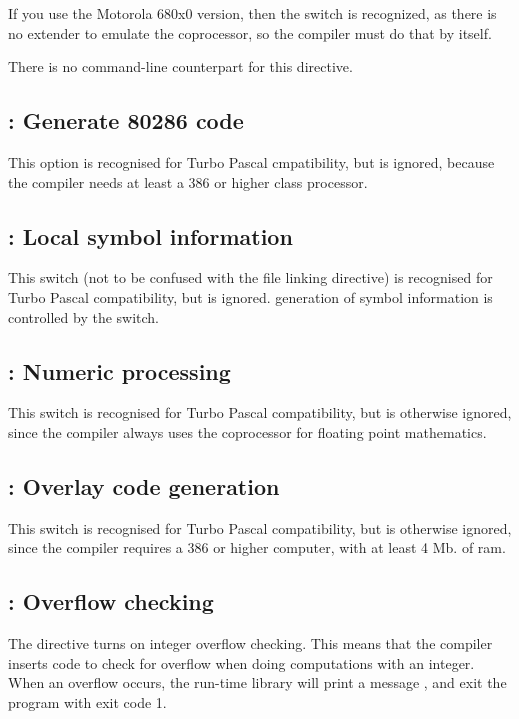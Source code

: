 \documentclass{report}
\begin{document}
If you use the Motorola 680x0 version, then the switch is recognized, as
there is no extender to emulate the coprocessor, so the compiler must do
that by itself.

There is no command-line counterpart for this directive.

\subsection{ : Generate 80286 code}

This option is recognised for Turbo Pascal cmpatibility, but is ignored,
because the compiler needs at least a 386 or higher class processor.


\subsection{ : Local symbol information}

This switch (not to be confused with the  file linking
directive) is recognised for Turbo Pascal compatibility, but is ignored.
generation of symbol information is controlled by the  switch. 

\subsection{ : Numeric processing }

This switch is recognised for Turbo Pascal compatibility, but is otherwise
ignored, since the compiler always uses the coprocessor for floating point
mathematics.

\subsection{ : Overlay code generation }

This switch is recognised for Turbo Pascal compatibility, but is otherwise
ignored, since the compiler requires a 386 or higher computer, with at 
least 4 Mb. of ram.

\subsection{ : Overflow checking}
The  directive turns on integer overflow checking. 
This means that the compiler inserts code to check for overflow when doing 
computations with an integer. 
When an overflow occurs, the run-time library will print a message 
, and exit the program with exit code 1.
\end{document}
